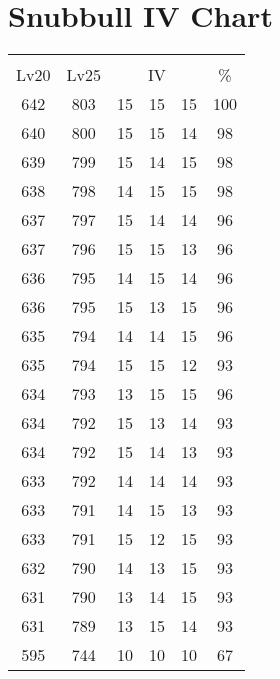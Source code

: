 \documentclass{article}%
\begin{document}
%
\normalsize%
\section{Snubbull IV Chart}%
\label{sec:Snubbull IV Chart}%
\renewcommand{\arraystretch}{1.5}%
\begin{tabular}{|c|c|c|c|c|c|}%
\hline%
\multicolumn{6}{|c|}{\textcolor{white}{ 
\linebreak{Snubbull}
}%
\cellcolor{black}}\\%
\multicolumn{1}{|c}{Lv20}&\multicolumn{1}{c|}{Lv25}&\multicolumn{3}{c|}{IV}&\multicolumn{1}{|c|}{\%}\\%
\hline%
\rowcolor{color100}%
642&803&15&15&15&100\\%
\hline%
\rowcolor{color98}%
640&800&15&15&14&98\\%
\hline%
\rowcolor{color98}%
639&799&15&14&15&98\\%
\hline%
\rowcolor{color98}%
638&798&14&15&15&98\\%
\hline%
\rowcolor{color96}%
637&797&15&14&14&96\\%
\hline%
\rowcolor{color96}%
637&796&15&15&13&96\\%
\hline%
\rowcolor{color96}%
636&795&14&15&14&96\\%
\hline%
\rowcolor{color96}%
636&795&15&13&15&96\\%
\hline%
\rowcolor{color96}%
635&794&14&14&15&96\\%
\hline%
\rowcolor{color93}%
635&794&15&15&12&93\\%
\hline%
\rowcolor{color96}%
634&793&13&15&15&96\\%
\hline%
\rowcolor{color93}%
634&792&15&13&14&93\\%
\hline%
\rowcolor{color93}%
634&792&15&14&13&93\\%
\hline%
\rowcolor{color93}%
633&792&14&14&14&93\\%
\hline%
\rowcolor{color93}%
633&791&14&15&13&93\\%
\hline%
\rowcolor{color93}%
633&791&15&12&15&93\\%
\hline%
\rowcolor{color93}%
632&790&14&13&15&93\\%
\hline%
\rowcolor{color93}%
631&790&13&14&15&93\\%
\hline%
\rowcolor{color93}%
631&789&13&15&14&93\\%
\hline%
\rowcolor{color91}%
595&744&10&10&10&67\\%
\end{tabular}

%
\end{document}
